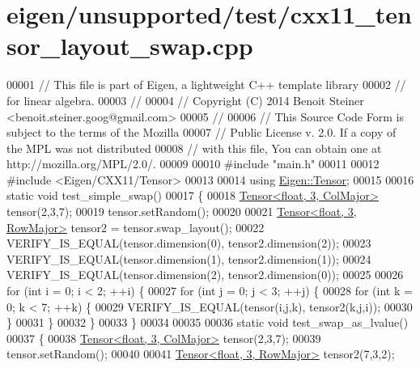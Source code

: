 \hypertarget{eigen_2unsupported_2test_2cxx11__tensor__layout__swap_8cpp_source}{}\section{eigen/unsupported/test/cxx11\+\_\+tensor\+\_\+layout\+\_\+swap.cpp}
\label{eigen_2unsupported_2test_2cxx11__tensor__layout__swap_8cpp_source}

\begin{DoxyCode}
00001 \textcolor{comment}{// This file is part of Eigen, a lightweight C++ template library}
00002 \textcolor{comment}{// for linear algebra.}
00003 \textcolor{comment}{//}
00004 \textcolor{comment}{// Copyright (C) 2014 Benoit Steiner <benoit.steiner.goog@gmail.com>}
00005 \textcolor{comment}{//}
00006 \textcolor{comment}{// This Source Code Form is subject to the terms of the Mozilla}
00007 \textcolor{comment}{// Public License v. 2.0. If a copy of the MPL was not distributed}
00008 \textcolor{comment}{// with this file, You can obtain one at http://mozilla.org/MPL/2.0/.}
00009 
00010 \textcolor{preprocessor}{#include "main.h"}
00011 
00012 \textcolor{preprocessor}{#include <Eigen/CXX11/Tensor>}
00013 
00014 \textcolor{keyword}{using} \hyperlink{class_eigen_1_1_tensor}{Eigen::Tensor};
00015 
00016 \textcolor{keyword}{static} \textcolor{keywordtype}{void} test\_simple\_swap()
00017 \{
00018   \hyperlink{class_eigen_1_1_tensor}{Tensor<float, 3, ColMajor>} tensor(2,3,7);
00019   tensor.setRandom();
00020 
00021   \hyperlink{class_eigen_1_1_tensor}{Tensor<float, 3, RowMajor>} tensor2 = tensor.swap\_layout();
00022   VERIFY\_IS\_EQUAL(tensor.dimension(0), tensor2.dimension(2));
00023   VERIFY\_IS\_EQUAL(tensor.dimension(1), tensor2.dimension(1));
00024   VERIFY\_IS\_EQUAL(tensor.dimension(2), tensor2.dimension(0));
00025 
00026   \textcolor{keywordflow}{for} (\textcolor{keywordtype}{int} i = 0; i < 2; ++i) \{
00027     \textcolor{keywordflow}{for} (\textcolor{keywordtype}{int} j = 0; j < 3; ++j) \{
00028       \textcolor{keywordflow}{for} (\textcolor{keywordtype}{int} k = 0; k < 7; ++k) \{
00029         VERIFY\_IS\_EQUAL(tensor(i,j,k), tensor2(k,j,i));
00030       \}
00031     \}
00032   \}
00033 \}
00034 
00035 
00036 \textcolor{keyword}{static} \textcolor{keywordtype}{void} test\_swap\_as\_lvalue()
00037 \{
00038   \hyperlink{class_eigen_1_1_tensor}{Tensor<float, 3, ColMajor>} tensor(2,3,7);
00039   tensor.setRandom();
00040 
00041   \hyperlink{class_eigen_1_1_tensor}{Tensor<float, 3, RowMajor>} tensor2(7,3,2);

\end{DoxyCode}
